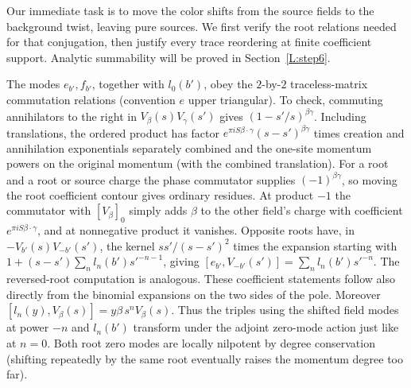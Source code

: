 Our immediate task is to move the color shifts from the source fields to
the background twist, leaving pure sources. We first verify the root
relations needed for that conjugation, then justify every trace
reordering at finite coefficient support. Analytic summability will be
proved in Section~\ref{L:step6}.

The modes \(e_{b'},f_{b'}\), together with \(l_0(b')\), obey the \(2\)-by-\(2\) traceless-matrix commutation relations (convention \(e\) upper triangular). To check, commuting annihilators to the right in \(V_\beta(s)V_\gamma(s')\) gives \((1-s'/s)^{\beta\gamma}\). Including translations, the ordered product has factor \(e^{\pi i S\beta\cdot\gamma}(s-s')^{\beta\gamma}\) times creation and annihilation exponentials separately combined and the one-site momentum powers on the original momentum (with the combined translation). For a root and a root or source charge the phase commutator supplies \((-1)^{\beta\gamma}\), so moving the root coefficient contour gives ordinary residues. At product \(-1\) the commutator with \([V_\beta]_0\) simply adds \(\beta\) to the other field's charge with coefficient \(e^{\pi i S\beta\cdot\gamma}\), and at nonnegative product it vanishes. Opposite roots have, in \(-V_{b'}(s)V_{-b'}(s')\), the kernel \(s s'/(s-s')^2\) times the expansion starting with
\(1+(s-s')\sum_n l_n(b')s'^{-n-1}\), giving \([e_{b'},V_{-b'}(s')]=\sum_n l_n(b')s'^{-n}\). The reversed-root computation is analogous. These coefficient statements follow also directly from the binomial expansions on the two sides of the pole. Moreover \([l_n(y),V_\beta(s)]=y\beta\,s^n V_\beta(s)\). Thus the triples using the shifted field modes at power \(-n\) and \(l_n(b')\) transform under the adjoint zero-mode action just like at \(n=0\). Both root zero modes are locally nilpotent by degree conservation (shifting repeatedly by the same root eventually raises the momentum degree too far).

